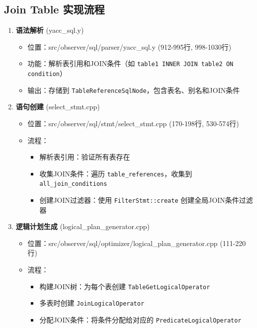 \documentclass[a4paper, 12pt]{article}
\begin{document}
\subsection{\heiti Join Table 实现流程}
\begin{enumerate}
    \item \textbf{语法解析} (yacc\_sql.y)
    \begin{itemize}
        \item 位置：src/observer/sql/parser/yacc\_sql.y (912-995行, 998-1030行)
        \item 功能：解析表引用和JOIN条件（如 \texttt{table1 INNER JOIN table2 ON condition}）
        \item 输出：存储到 \texttt{TableReferenceSqlNode}，包含表名、别名和JOIN条件
    \end{itemize}
    
    \item \textbf{语句创建} (select\_stmt.cpp)
    
\begin{itemize}
        \item 位置：src/observer/sql/stmt/select\_stmt.cpp (170-198行, 530-574行)
        \item 流程：
        \begin{itemize}
            \item 解析表引用：验证所有表存在
            \item 收集JOIN条件：遍历 \texttt{table\_references}，收集到 \texttt{all\_join\_conditions}
            \item 创建JOIN过滤器：使用 \texttt{FilterStmt::create} 创建全局JOIN条件过滤器
        \end{itemize}
    \end{itemize}
    
    \item \textbf{逻辑计划生成} (logical\_plan\_generator.cpp)
    
\begin{itemize}
        \item 位置：src/observer/sql/optimizer/logical\_plan\_generator.cpp (111-220行)
        \item 流程：
        \begin{itemize}
            \item 构建JOIN树：为每个表创建 \texttt{TableGetLogicalOperator}
            \item 多表时创建 \texttt{JoinLogicalOperator}
            \item 分配JOIN条件：将条件分配给对应的 \texttt{PredicateLogicalOperator}
        \end{itemize}
    \end{itemize}
    

\end{enumerate}
\end{document}
